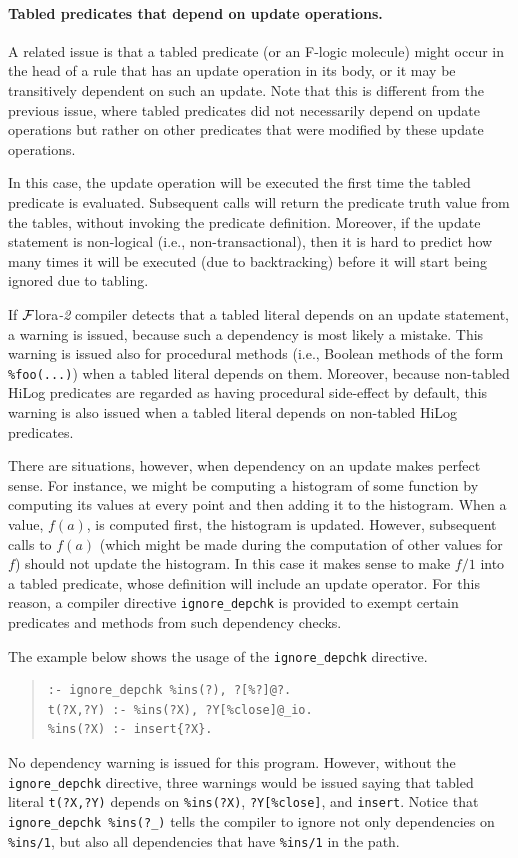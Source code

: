 \documentclass[11pt]{article}
\newcommand{\FLORA}{{\mbox{\sc ${\cal F}${lora}\rm\emph{-2}}}\xspace}
\begin{document}
\paragraph{Tabled predicates that depend on update operations.}
\label{page-depchk}
A related issue is that a tabled predicate (or an F-logic molecule)
might occur in the head of a rule that has an update operation in its body,
or it may be transitively dependent on such an update. Note that this is
different from the previous issue, where tabled predicates did not
necessarily depend on update operations but rather on other predicates that
were modified by these update operations.

In this case, the update operation will be executed the first time the
tabled predicate is evaluated. Subsequent calls will return the predicate truth
value from the tables, without invoking the predicate definition.
Moreover, if the update statement is non-logical (i.e.,
non-transactional), then it is hard to predict how many times it will be
executed (due to backtracking) before it will start being ignored due to
tabling.

If \FLORA compiler detects that a tabled literal depends on an update
statement, a warning is issued, because such a dependency is most likely a
mistake. This warning is issued also for procedural methods (i.e.,
Boolean methods of the form {\tt \%foo(...)}) when a tabled literal depends
on them. Moreover, because non-tabled HiLog predicates are regarded as having
procedural side-effect by default, this warning is also issued when a
tabled literal depends on non-tabled HiLog predicates.   

There are situations, however, when dependency on an update makes perfect
sense. For instance, we might be computing a histogram of some function
by computing its values at every point and then adding it to the
histogram. When a value, $f(a)$, is computed first, the histogram is
updated. However, subsequent calls to $f(a)$ (which might be made during
the computation of other values for $f$) should not update the histogram.
In this case it makes sense to make $f/1$ into a tabled predicate, whose
definition will include an update operator. For this reason, a compiler
directive {\tt ignore\_depchk} is provided to exempt certain predicates
and methods from such dependency checks.

The example below shows the usage of the {\tt ignore\_depchk} directive.
\begin{quote}
\begin{verbatim}
:- ignore_depchk %ins(?), ?[%?]@?.
t(?X,?Y) :- %ins(?X), ?Y[%close]@_io. 
%ins(?X) :- insert{?X}. 
\end{verbatim}
\end{quote}
No dependency warning is issued for this program. However, without the
{\tt ignore\_depchk} directive, three warnings would be issued saying that
tabled literal {\tt t(?X,?Y)} depends on {\tt \%ins(?X)}, {\tt ?Y[\%close]},
and {\tt insert}. Notice that {\tt ignore\_depchk \%ins(?\_)} tells the
compiler to ignore not only dependencies on {\tt \%ins/1}, but also all
dependencies that have {\tt \%ins/1} in the path.
\end{document}
